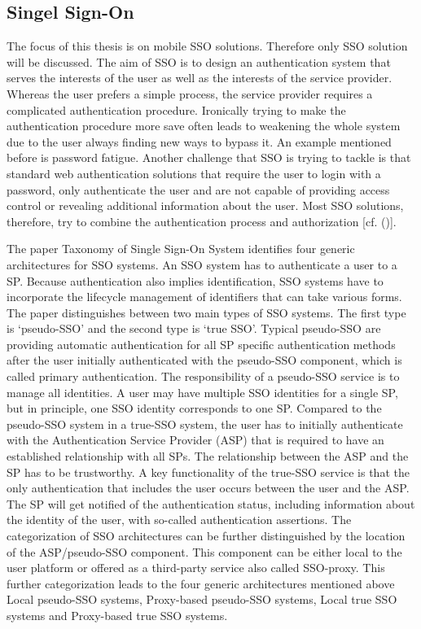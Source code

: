 {{{	\subsection{Singel Sign-On}	The focus of this thesis is on mobile SSO solutions. Therefore only SSO solution will be discussed. The aim of SSO is to design an authentication system that serves the interests of the user as well as the interests of the service provider. Whereas the user prefers a simple process, the service provider requires a complicated authentication procedure. Ironically trying to make the authentication procedure more save often leads to weakening the whole system due to the user always finding new ways to bypass it. An example mentioned before is password fatigue. Another challenge that SSO is trying to tackle is that standard web authentication solutions that require the user to login with a password, only authenticate the user and are not capable of providing access control or revealing additional information about the user. Most SSO solutions, therefore, try to combine the authentication process and authorization [cf. (\cite{Prochazka:2010:UCA})].
	
	The paper Taxonomy of Single Sign-On System \cite{Pashalidis:2003:10.1007/3-540-45067-X_22} identifies four generic architectures for SSO systems. An SSO system has to authenticate a user to a SP. Because authentication also implies identification, SSO systems have to incorporate the lifecycle management of identifiers that can take various forms. The paper distinguishes between two main types of SSO systems. The first type is ‘pseudo-SSO’ and the second type is ‘true SSO’. Typical pseudo-SSO are providing automatic authentication for all SP specific authentication methods after the user initially authenticated with the pseudo-SSO component, which is called primary authentication. The responsibility of a pseudo-SSO service is to manage all identities. A user may have multiple SSO identities for a single SP, but in principle, one SSO identity corresponds to one SP. Compared to the pseudo-SSO system in a true-SSO system, the user has to initially authenticate with the Authentication Service Provider (ASP) that is required to have an established relationship with all SPs. The relationship between the ASP and the SP has to be trustworthy. A key functionality of the true-SSO service is that the only authentication that includes the user occurs between the user and the ASP. The SP will get notified of the authentication status, including information about the identity of the user, with so-called authentication assertions. The categorization of SSO architectures can be further distinguished by the location of the ASP/pseudo-SSO component. This component can be either local to the user platform or offered as a third-party service also called SSO-proxy. This further categorization leads \cite{Pashalidis:2003:10.1007/3-540-45067-X_22} to the four generic architectures mentioned above Local pseudo-SSO systems, Proxy-based pseudo-SSO systems, Local true SSO systems and Proxy-based true SSO systems.
	
}}}
